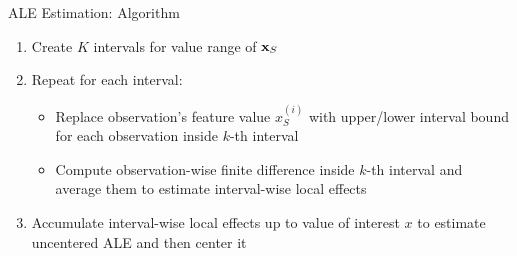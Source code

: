 \documentclass[11pt,compress,t,notes=noshow, aspectratio=169, xcolor=table]{beamer}
\begin{document}
\begin{frame}{ALE Estimation: Algorithm}

\begin{enumerate}
	\item Create $K$ intervals for value range of $\xv_S$
	\item Repeat for each interval: %
	  \begin{itemize}
	  \item Replace observation's feature value $x_S^{(i)}$ with upper/lower interval bound for each observation inside $k$-th interval
	  \item Compute observation-wise finite difference inside $k$-th interval and average them to estimate interval-wise local effects
	  \end{itemize}
  \item Accumulate interval-wise local effects up to value of interest $x$ to estimate uncentered ALE and then center it
\end{enumerate}

\end{frame}

\end{document}
